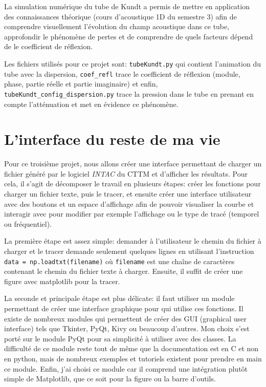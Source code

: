 \documentclass[a4paper, 11pt]{article}
\begin{document}
La simulation numérique du tube de Kundt a permis de mettre en application des connaissances théorique (cours d'acoustique 1D du semestre 3) afin de comprendre visuellement l'évolution du champ acoustique dans ce tube, approfondir le phénomène de pertes et de comprendre de quels facteurs dépend de le coefficient de réflexion.

 Les fichiers utilisés pour ce projet sont: \verb|tubeKundt.py| qui contient l'animation du tube avec la dispersion, \verb|coef_refl| trace le coefficient de réflexion (module, phase, partie réelle et partie imaginaire) et enfin, \verb|tubeKundt_config_dispersion.py| trace la pression dans le tube en prenant en compte l'atténuation et met en évidence ce phénomène.
 
 
 
 


\newpage
\section{L'interface du reste de ma vie}

Pour ce troisième projet, nous allons créer une interface permettant de charger un fichier généré par le logiciel \textit{INTAC} du CTTM et d'afficher les résultats. Pour cela, il s'agit de décomposer le travail en plusieurs étapes: créer les fonctions pour charger un fichier texte, puis le tracer, et ensuite créer une interface utilisateur avec des boutons et un espace d'affichage afin de pouvoir visualiser la courbe et interagir avec pour modifier par exemple l'affichage ou le type de tracé (temporel ou fréquentiel). 

La première étape est assez simple: demander à l'utilisateur le chemin du fichier à charger et le tracer demande seulement quelques lignes en utilisant l'instruction \verb|data = np.loadtxt(filename)| où \verb|filename| est une chaîne de caractères contenant le chemin du fichier texte à charger. Ensuite, il suffit de créer une figure avec matplotlib pour la tracer.

La seconde et principale étape est plus délicate: il faut utiliser un module permettant de créer une interface graphique pour qui utilise ces fonctions. Il existe de nombreux modules qui permettent de créer des GUI (graphical user interface) tels que Tkinter, PyQt, Kivy ou beaucoup d'autres. Mon choix s'est porté sur le module PyQt pour sa simplicité à utiliser avec des classes. La difficulté de ce module reste tout de même que la documentation est en C et non en python, mais de nombreux exemples et tutoriels existent pour prendre en main ce module. Enfin, j'ai choisi ce module car il comprend une intégration plutôt simple de Matplotlib, que ce soit pour la figure ou la barre d'outils.
\end{document}
